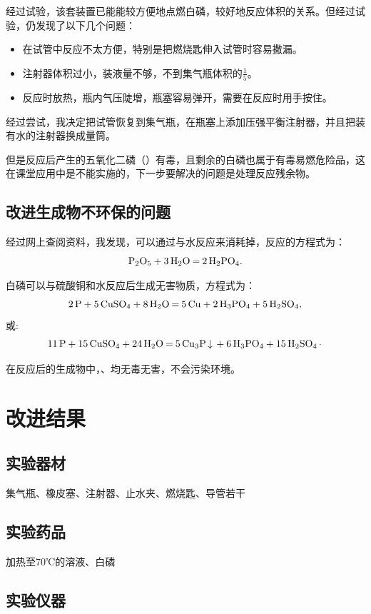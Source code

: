 \documentclass[11pt,a4paper,titlepage,twocolumn]{ctexart}
\begin{document}
	经过试验，该套装置已能能较方便地点燃白磷，较好地反应体积的关系。但经过试验，仍发现了以下几个问题：
	
	\begin{itemize}
		\item 在试管中反应不太方便，特别是把燃烧匙伸入试管时容易撒漏。
		\item 注射器体积过小，装液量不够，不到集气瓶体积的$\frac{1}{5}$。
		\item 反应时放热，瓶内气压陡增，瓶塞容易弹开，需要在反应时用手按住。
	\end{itemize}
	
	经过尝试，我决定把试管恢复到集气瓶，在瓶塞上添加压强平衡注射器，并且把装有水的注射器换成量筒。
	
	但是反应后产生的五氧化二磷（）有毒，且剩余的白磷也属于有毒易燃危险品，这在课堂应用中是不能实施的，下一步要解决的问题是处理反应残余物。
	
	\subsection{改进生成物不环保的问题}
	
	经过网上查阅资料，我发现，可以通过与水反应来消耗掉，反应的方程式为：
	\[\ce{P2O5 + 3H2O = 2H2PO4}.\]
	
	白磷可以与硫酸铜和水反应后生成无害物质，方程式为：
	{\footnotesize \[\ce{2P + 5CuSO4 + 8H2O = 5Cu + 2H3PO4 + 5H2SO4},\]}
	或:{\scriptsize \[\ce{11P + 15CuSO4 + 24H2O = 5Cu3P v + 6H3PO4 + 15H2SO4.}\]}
	
	在反应后的生成物中，、均无毒无害，不会污染环境。
	
	\section{改进结果}
	\subsection{实验器材}
	
	集气瓶、橡皮塞、注射器、止水夹、燃烧匙、导管若干
	
	\subsection{实验药品}
	
	加热至70℃的溶液、白磷
	
	\subsection{实验仪器}
	
\end{document}
